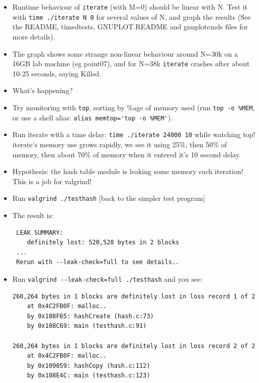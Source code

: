 \documentclass[aspectratio=169]{beamer}
\newcommand{\pitem}{\pause \item}
\begin{document}
\begin{frame}[fragile]
    \begin{itemize}

    \item
      Runtime behaviour of \verb+iterate+ (with M=0) \alert{should be linear with N}.
      Test it with \verb+time ./iterate N 0+ for several values of N,
      and graph the results
      (See the README, timedtests, GNUPLOT.README and gnuplotcmds files for more details).

    \pitem
      The graph shows \alert{some strange non-linear behaviour} around N=30k
      on a 16GB lab machine (eg point07),
      \pause
      and for N=38k \verb+iterate+ crashes after about 10-25 seconds,
      saying \alert{Killed}.
    \item
      What's happening?
    \pitem
      Try monitoring with \verb+top+, sorting by \%age of memory used (run \verb+top -o %MEM+, or use a shell alias: \verb+alias memtop='top -o %MEM'+).
    \pause
    \item
      Run iterate with a time delay: \verb+time ./iterate 24000 10+
      while watching top!
      \pause
      iterate's memory use
      \alert{grows rapidly}, we see it using 25\%, then 50\% of memory,
      then about 70\% of memory when it entered it's 10 second delay.
    \pitem
      Hypothesis: the hash table module is leaking some memory each iteration!
      \pause
      This is a job for valgrind!
    \end{itemize}
\end{frame}

\begin{frame}[fragile]
    \begin{itemize}
    \item
      Run \verb+valgrind ./testhash+ [back to the simpler test program]
    \pitem
      The result is:
\begin{verbatim}
 LEAK SUMMARY:
    definitely lost: 520,528 bytes in 2 blocks
 ...
 Rerun with --leak-check=full to see details..
\end{verbatim}
    \pause
    \item
      Run \verb+valgrind --leak-check=full ./testhash+ and you see:

\begin{verbatim}
260,264 bytes in 1 blocks are definitely lost in loss record 1 of 2
    at 0x4C2FB0F: malloc..
    by 0x108F65: hashCreate (hash.c:73)
    by 0x108C69: main (testhash.c:91)
 
260,264 bytes in 1 blocks are definitely lost in loss record 2 of 2
    at 0x4C2FB0F: malloc..
    by 0x109059: hashCopy (hash.c:112)
    by 0x108E4C: main (testhash.c:123)
\end{verbatim}

  \end{itemize}
\end{frame}
\end{document}
